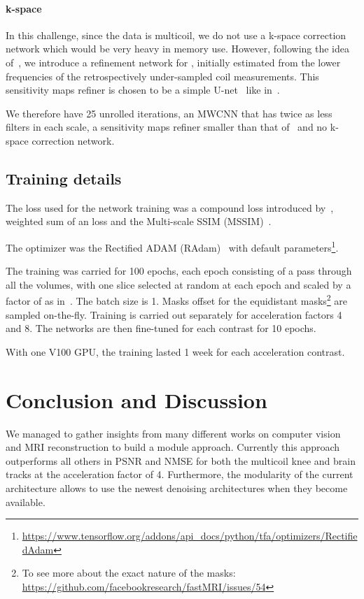 \documentclass{article}
\begin{document}
\paragraph{k-space}In this challenge, since the data is multicoil, we do not use a k-space correction network which would be very heavy in memory use.
However, following the idea of~\citep{Sriram2020End-to-EndReconstruction}, we introduce a refinement network for , initially estimated from the lower frequencies of the retrospectively under-sampled coil measurements.
This sensitivity maps refiner is chosen to be a simple U-net~\citep{Ronneberger} like in~\citep{Sriram2020End-to-EndReconstruction}.

We therefore have 25 unrolled iterations, an MWCNN that has twice as less filters in each scale, a sensitivity maps refiner smaller than that of~\citep{Sriram2020End-to-EndReconstruction} and no k-space correction network.

\subsection{Training details}

The loss used for the network training was a compound loss introduced by~\citep{Pezzotti2020AnChallenge}, weighted sum of an  loss and the Multi-scale SSIM (MSSIM)~\citep{Wang2004}.

The optimizer was the Rectified ADAM (RAdam)~\citep{Liu2020OnBeyond} with default parameters\footnote{\url{https://www.tensorflow.org/addons/api_docs/python/tfa/optimizers/RectifiedAdam}}.

The training was carried for 100 epochs, each epoch consisting of a pass through all the volumes, with one slice selected at random at each epoch and scaled by a factor of  as in~\citep{Ramzi2020BenchmarkingDatasets}.
The batch size is 1.
Masks offset for the equidistant masks\footnote{To see more about the exact nature of the masks: \url{https://github.com/facebookresearch/fastMRI/issues/54}} are sampled on-the-fly.
Training is carried out separately for acceleration factors 4 and 8.
The networks are then fine-tuned for each contrast for 10 epochs.

With one V100 GPU, the training lasted 1 week for each acceleration contrast.


\section{Conclusion and Discussion}
We managed to gather insights from many different works on computer vision and MRI reconstruction to build a module approach.
Currently this approach outperforms all others in PSNR and NMSE for both the multicoil knee and brain tracks at the acceleration factor of 4.
Furthermore, the modularity of the current architecture allows to use the newest denoising architectures when they become available.
\end{document}
